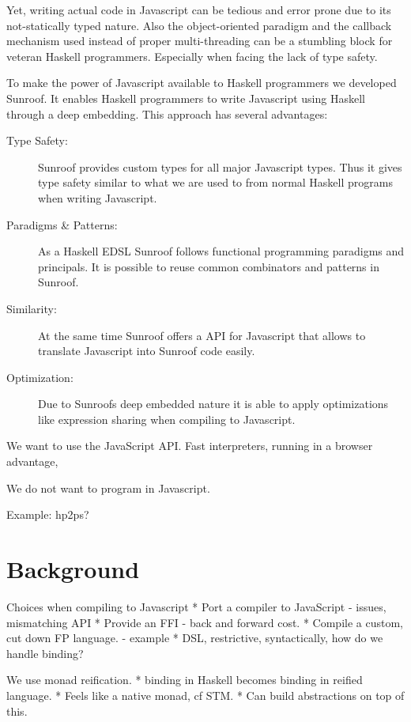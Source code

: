 \documentclass{llncs}
\begin{document}
Yet, writing actual code in Javascript can be tedious and error prone 
due to its not-statically typed nature. Also the object-oriented
paradigm and the callback mechanism used instead of proper multi-threading 
can be a stumbling block for veteran Haskell programmers. Especially when
facing the lack of type safety.

To make the power of Javascript available to Haskell programmers 
we developed Sunroof. It enables Haskell programmers to write
Javascript using Haskell through a deep embedding. This 
approach has several advantages:

\begin{description}
\item[Type Safety:] Sunroof provides custom types for all major Javascript
types. Thus it gives type safety similar to what we are used to from 
normal Haskell programs when writing Javascript.
\item[Paradigms \& Patterns:] As a Haskell EDSL Sunroof follows functional programming 
paradigms and principals. It is possible to reuse common combinators and 
patterns in Sunroof.
\item[Similarity:] At the same time Sunroof offers a API for Javascript 
that allows to translate Javascript into Sunroof code easily.
\item[Optimization:] Due to Sunroofs deep embedded nature it is able
to apply optimizations like expression sharing when compiling to Javascript.
\end{description}


We want to use the JavaScript API. Fast interpreters,
running in a browser advantage, 

We do not want to program in Javascript.

Example: hp2ps?

\section{Background}

Choices when compiling to Javascript
 * Port a compiler to JavaScript - issues, mismatching API
 * Provide an FFI - back and forward cost.
 * Compile a custom, cut down FP language. - example
 * DSL, restrictive, syntactically, how do we handle binding?

We use monad reification.
 * binding in Haskell becomes binding in reified language.
 * Feels like a native monad, cf STM.
 * Can build abstractions on top of this.
\end{document}
